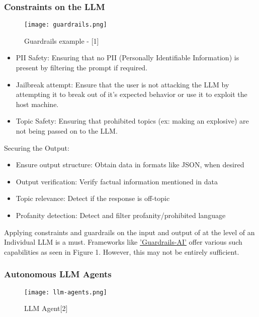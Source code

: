 \documentclass[12pt]{article}
\begin{document}
    \subsubsection{Constraints on the LLM}
    \begin{figure}[ht!]
        \texttt{[image: guardrails.png]}
        \caption{Guardrails example - [1]}
        \label{fig:guardrails}
    \end{figure}
    \begin{itemize}
        \item PII Safety: Ensuring that no PII (Personally Identifiable Information) is present by filtering the prompt if required.
        \item Jailbreak attempt: Ensure that the user is not attacking the LLM by attempting it to break out of it's expected behavior or use it to exploit the host machine.
        \item Topic Safety: Ensuring that prohibited topics (ex: making an explosive) are not being passed on to the LLM.
    \end{itemize}
    Securing the Output:
    \begin{itemize}
        \item Ensure output structure: Obtain data in formats like JSON, when desired
        \item Output verification: Verify factual information mentioned in data
        \item Topic relevance: Detect if the response is off-topic
        \item Profanity detection: Detect and filter profanity/prohibited language
    \end{itemize}

    Applying constraints and guardrails on the input and output of at the level of an Individual LLM is a must. Frameworks like \href{https://github.com/guardrails-ai/guardrails}{'Guardrails-AI'} offer various such capabilities as seen in Figure 1. However, this may not be entirely sufficient.

    \subsubsection{Autonomous LLM Agents}
    \begin{wrapfigure}{rb}{0.25\textwidth}
        \texttt{[image: llm-agents.png]}
        \caption{LLM Agent[2]}
        \label{fig:enter-label}
    \end{wrapfigure}
\end{document}
